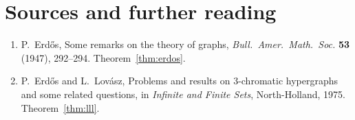 \section*{Sources and further reading}

\begin{enumerate}
\item P.~Erd\H os, Some remarks on the theory of graphs, \emph{Bull.\ Amer.\ Math.\ Soc.} \textbf{53} (1947), 292--294. Theorem~\ref{thm:erdos}.
\item P.~Erd\H os and L.~Lov\'asz, Problems and results on $3$-chromatic hypergraphs and some related questions, in \emph{Infinite and Finite Sets}, North-Holland, 1975. Theorem~\ref{thm:lll}.
\end{enumerate}

